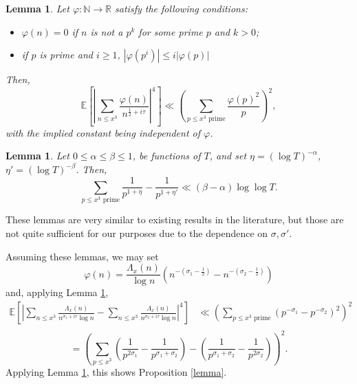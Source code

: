 \documentclass{article}
\newcommand{\phe}{\varphi}
\newcommand{\1}{\mathds{1}}
\numberwithin{equation}{section}
\renewcommand{\leq}{\leqslant}
\renewcommand{\geq}{\geqslant}
\newcommand{\E}{\mathbb{E}}
\newcommand{\R}{\mathbb{R}}
\newcommand{\N}{\mathbb{N}}
\theoremstyle{plain} %
\newtheorem{lemma}[theorem]{Lemma}
\newcommand{\hf}{\frac{1}{2}}
\begin{document}
\begin{lemma}
    Let $\phe : \N \rightarrow \R$ satisfy the following conditions:
    \label{lemmaphe}
    \begin{itemize}
        \item $\phe(n) = 0$ if $n$ is not a $p^k$ for some prime $p$ and $k > 0$;
        \item if $p$ is prime and $i \geq 1$, $|\phe(p^i)| \leq i |\phe(p)|$
    \end{itemize}
    Then,
\begin{equation}
    \E\left[ \left|\sum_{n \leq x^3} \frac{\phe(n)}{n^{\hf + i \tau}} \right|^4 \right] \ll \left( \sum_{p \leq x^3 \text{ prime}} \frac{\phe(p)^2}{p} \right)^2,
\end{equation}
    with the implied constant being independent of $\phe$.
\end{lemma}

\begin{lemma}
\label{tech}
    Let $0 \leq \alpha \leq \beta \leq 1$, be functions of $T$, and set  $\eta = (\log T)^{-\alpha}$, $\eta' = (\log T)^{-\beta}$. Then,
    \begin{equation}
            \sum_{p \leq x^3 \text{ prime}} \frac{1}{p^{1 + \eta}} - \frac{1}{p^{1 + \eta'}} \ll (\beta - \alpha)\log \log T.
    \end{equation}
\end{lemma}

These lemmas are very similar to existing results in the literature, but those are not quite sufficient for our purposes due to the dependence on $\sigma, \sigma'$.

Assuming these lemmas, we may set
\begin{equation}
    \phe(n) = \frac{\Lambda_x(n)}{\log n}(n^{-(\sigma_1 - \hf)} - n^{-(\sigma_2 - \hf)})
\end{equation}
and, applying Lemma \ref{lemmaphe},
\begin{equation}
    \begin{split}
        \E \left[\left|\sum_{n \leq x^3} \frac{\Lambda_x(n)}{n^{\sigma_1 + i \tau} \log n} - \sum_{n \leq x^3} \frac{\Lambda_x(n)}{n^{\sigma_2 + i \tau} \log n} \right|^4 \right] & \ll 
        \left( \sum_{p \leq x^3 \text{ prime}} (p^{-\sigma_1} - p^{-\sigma_2})^2 \right)^2 \\
    \end{split}
\end{equation}
\begin{equation*}
    = \left( \sum_{p \leq x^3} \left(\frac{1}{p^{2\sigma_1}} - \frac{1}{p^{\sigma_1 + \sigma_2}}\right) - \left( \frac{1}{p^{\sigma_1 + \sigma_2}} - \frac{1}{p^{2 \sigma_2}} \right) \right)^2.
\end{equation*}
Applying Lemma \ref{tech}, this shows Proposition \ref{lemma}.
\end{document}
